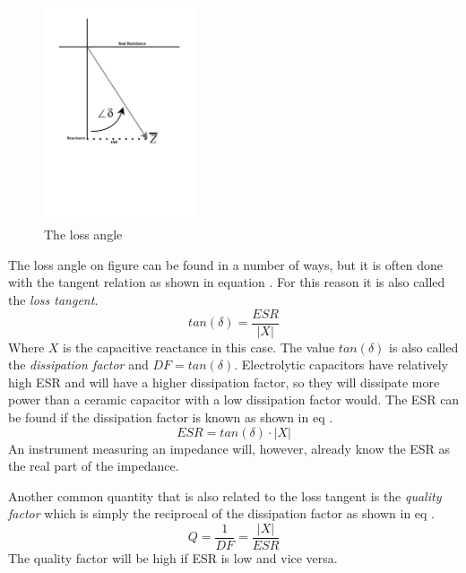 \begin{figure}[H]
    \centering
    \includegraphics[clip, trim=0 275 0 0, width=0.4\textwidth]{Sections/4_TechnicalAnalysis/Figures/4_1_4_LossTangent2.pdf}
    \caption{The loss angle }
    \label{fig:4_1_1_LossTangent2}
\end{figure}

The loss angle on figure  can be found in a number of ways, but it is often done with the tangent relation as shown in equation . For this reason it is also called the \textit{loss tangent}.
\begin{equation}\label{eq:4_1_1_LossAngle}
    tan(\delta) =\frac{ESR}{|X|} 
\end{equation}
Where $X$ is the capacitive reactance in this case. The value $tan(\delta)$ is also called the \textit{dissipation factor} and $DF = tan(\delta)$. Electrolytic capacitors have relatively high ESR and will have a higher dissipation factor, so they will dissipate more power than a ceramic capacitor with a low dissipation factor would. The ESR can be found if the dissipation factor is known as shown in eq .
\begin{equation}\label{eq:4_1_1_ESR}
    ESR =  tan(\delta)\cdot |X|
\end{equation}
An instrument measuring an impedance will, however, already know the ESR as the real part of the impedance.

Another common quantity that is also related to the loss tangent is the \textit{quality factor} which is simply the reciprocal of the dissipation factor as shown in eq .
\begin{equation}\label{eq:4_1_1_Q}
    Q = \frac{1}{DF} = \frac{|X|}{ESR}
\end{equation}
The quality factor will be high if ESR is low and vice versa.



